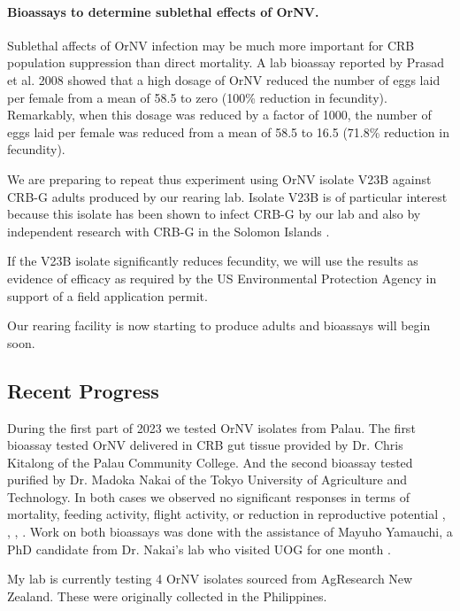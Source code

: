 \documentclass[12pt,letterpaper,english,bibliography=totocnumbered, abstract=on]{scrartcl}
\begin{document}
\paragraph{Bioassays to determine sublethal effects of OrNV.}

Sublethal affects of OrNV infection may be much more important for CRB population suppression than direct mortality. A lab bioassay reported by Prasad et al. 2008 \cite{prasadManagementCoconutRhinoceros2008} showed that a high dosage of OrNV reduced the number of eggs laid per female from a mean of 58.5 to zero (100\% reduction in fecundity). Remarkably, when this dosage was reduced by a factor of 1000, the number of eggs laid per female was reduced from a mean of 58.5 to 16.5 (71.8\% reduction in fecundity).

We are preparing to repeat thus experiment using OrNV isolate V23B against CRB-G adults produced by our rearing lab. Isolate V23B is of particular interest because this isolate has been shown to infect CRB-G by our lab and also by independent research with CRB-G in the Solomon Islands \cite{barreraElectronMicroscopyStudy2021}. 

If the V23B isolate significantly reduces fecundity, we will use the results as evidence of efficacy as required by the US Environmental Protection Agency in support of a field application permit.

Our rearing facility is now starting to produce adults and bioassays will begin soon.

\subsection{Recent Progress}

During the first part of 2023 we tested OrNV isolates from Palau. The first bioassay tested OrNV delivered in CRB gut tissue provided by Dr. Chris Kitalong of the Palau Community College. And the second bioassay tested purified by Dr. Madoka Nakai of the Tokyo University of Agriculture and Technology. In both cases we observed no significant responses in terms of mortality, feeding activity, flight activity, or reduction in reproductive potential \cite{mooreTestingPalauGut2022}, \cite{moorePalaugutsexperiment2022}, \cite{mooreFlightTest2023}, \cite{mooreGitHubRepositoryCrbflighttest2023}. Work on both bioassays was done with the assistance of Mayuho Yamauchi, a PhD candidate from Dr. Nakai's lab who visited UOG for one month \cite{hansonUOGTokyoUniversity2023}.

My lab is currently testing 4 OrNV isolates sourced from AgResearch New Zealand. These were originally collected in the Philippines.
\end{document}

